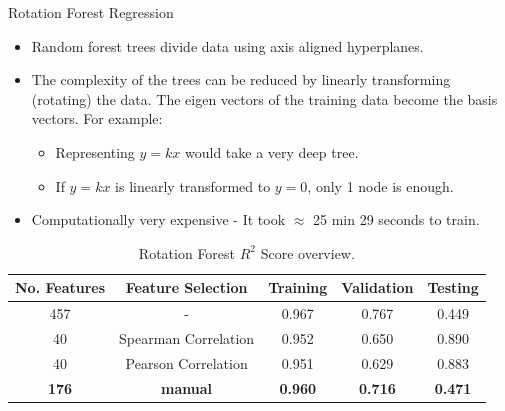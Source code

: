 \documentclass{beamer}
\begin{document}
\begin{frame}[t]{Rotation Forest Regression}
\begin{itemize}
\item Random forest trees divide data using axis aligned hyperplanes.
\item The complexity of the trees can be reduced by linearly transforming (rotating) the data.  The eigen vectors of the training data become the basis vectors.  For example:
\begin{itemize}
\item Representing $y = kx$ would take a very deep tree.
\item If $y = kx$ is linearly transformed to $y = 0$,  only 1 node is enough.
\end{itemize}

\item Computationally very expensive - It took $\approx$ 25 min 29 seconds to train.
\end{itemize}

\begin{table} [h!]
\centering
\resizebox{0.7\linewidth}{!} {
 \begin{tabular}{ | c | c | c | c | c | }
\hline
\textbf{No.  Features} & \textbf{Feature Selection} & \textbf{Training} & \textbf{Validation} & \textbf{Testing} \\ [0.5 ex]
\hline \hline
457 & - & 0.967 & 0.767 & 0.449\\
40 & Spearman Correlation & 0.952 & 0.650 & 0.890\\
40 & Pearson Correlation & 0.951 & 0.629 & 0.883 \\
\textbf{176} & \textbf{manual} & \textbf{0.960} & \textbf{0.716} & \textbf{0.471} \\ [1ex]
\hline
\end{tabular}
}
\caption{Rotation Forest $R^2$ Score overview.}
\label {table:4}
\end{table}

\end{frame}
\end{document}
